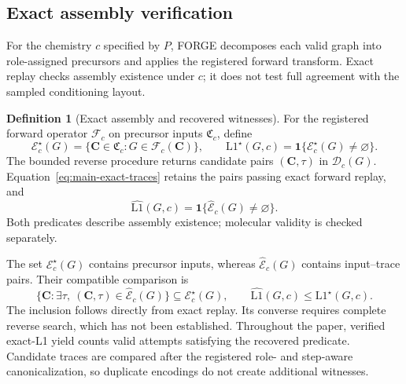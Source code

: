 \documentclass{article}
\theoremstyle{definition}
\newtheorem{definition}[theorem]{Definition}
\begin{document}
\subsection{Exact assembly verification}
\label{app:verification}

For the chemistry $c$ specified by $P$, FORGE decomposes each valid graph into role-assigned
precursors and applies the registered forward transform. Exact replay checks assembly existence
under $c$; it does not test full agreement with the sampled conditioning layout.

\begin{definition}[Exact assembly and recovered witnesses]
\label{def:exact-assembly}
For the registered forward operator $\mathcal F_c$ on precursor inputs $\mathfrak C_c$, define
\begin{equation}
 \mathcal E_c^\star(G)=\{\mathbf C\in\mathfrak C_c:G\in\mathcal F_c(\mathbf C)\},\qquad
 \mathrm{L1}^\star(G,c)=\mathbf1\{\mathcal E_c^\star(G)\neq\varnothing\}.
\end{equation}
The bounded reverse procedure returns candidate pairs $(\mathbf C,\tau)$ in $\mathcal D_c(G)$.
Equation~\ref{eq:main-exact-traces} retains the pairs passing exact forward replay, and
\begin{equation}
 \widehat{\mathrm{L1}}(G,c)=\mathbf1\{\widehat{\mathcal E}_c(G)\neq\varnothing\}.
\end{equation}
Both predicates describe assembly existence; molecular validity is checked separately.
\end{definition}
The set $\mathcal E_c^\star(G)$ contains precursor inputs, whereas
$\widehat{\mathcal E}_c(G)$ contains input--trace pairs. Their compatible comparison is
\begin{equation}
 \{\mathbf C:\exists\tau,\ (\mathbf C,\tau)\in\widehat{\mathcal E}_c(G)\}
 \subseteq\mathcal E_c^\star(G),\qquad
 \widehat{\mathrm{L1}}(G,c)\leq\mathrm{L1}^\star(G,c).
\end{equation}
The inclusion follows directly from exact replay. Its converse requires complete reverse search,
which has not been established. Throughout the paper, verified exact-L1 yield counts valid
attempts satisfying the recovered predicate. Candidate traces are compared after the registered
role- and step-aware canonicalization, so duplicate encodings do not create additional witnesses.
\end{document}
